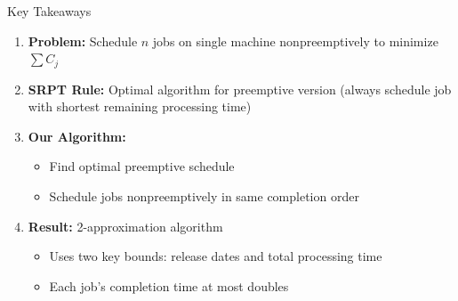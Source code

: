 \documentclass[aspectratio=169, 12pt]{beamer}
\begin{document}
\begin{frame}{Key Takeaways}
    \begin{enumerate}
        \item<1-> \textbf{Problem:} Schedule $n$ jobs on single machine nonpreemptively to minimize $\sum C_j$
        
        \vspace{0.3cm}
        \item<2-> \textbf{SRPT Rule:} Optimal algorithm for preemptive version (always schedule job with shortest remaining processing time)
        
        \vspace{0.3cm}
        \item<3-> \textbf{Our Algorithm:}
        \begin{itemize}
            \item Find optimal preemptive schedule
            \item Schedule jobs nonpreemptively in same completion order
        \end{itemize}
        
        \vspace{0.3cm}
        \item<4-> \textbf{Result:} 2-approximation algorithm
        \begin{itemize}
            \item Uses two key bounds: release dates and total processing time
            \item Each job's completion time at most doubles
        \end{itemize}
    \end{enumerate}
\end{frame}
\end{document}
